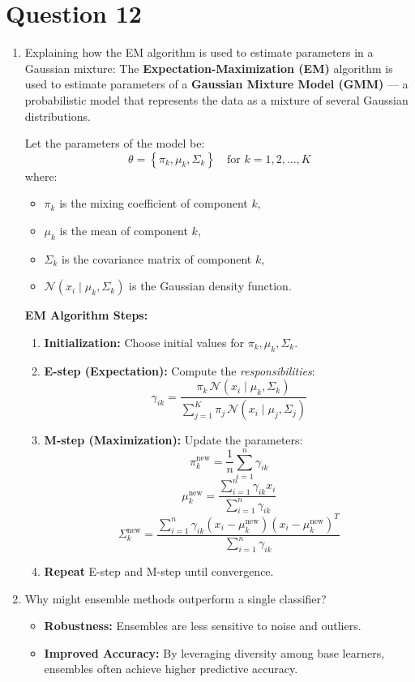 \documentclass[a4paper,12pt]{article}
\begin{document}
\section*{Question 12}
\begin{enumerate}[label=(\alph*)]
    \item Explaining how the EM algorithm is used to estimate parameters in a Gaussian mixture:
    The \textbf{Expectation-Maximization (EM)} algorithm is used to estimate parameters of a \textbf{Gaussian Mixture Model (GMM)} --- a probabilistic model that represents the data as a mixture of several Gaussian distributions.

    Let the parameters of the model be:
    \[
    \theta = \left\{ \pi_k, \mu_k, \Sigma_k \right\} \quad \text{for } k = 1, 2, \dots, K
    \]
    where:
    \begin{itemize}
        \item \( \pi_k \) is the mixing coefficient of component \( k \),
        \item \( \mu_k \) is the mean of component \( k \),
        \item \( \Sigma_k \) is the covariance matrix of component \( k \),
        \item \( \mathcal{N}(x_i \mid \mu_k, \Sigma_k) \) is the Gaussian density function.
    \end{itemize}

    \textbf{EM Algorithm Steps:}
    \begin{enumerate}
        \item \textbf{Initialization:} Choose initial values for \( \pi_k, \mu_k, \Sigma_k \).

        \item \textbf{E-step (Expectation):} Compute the \textit{responsibilities}:
        \[
        \gamma_{ik} = \frac{ \pi_k \, \mathcal{N}(x_i \mid \mu_k, \Sigma_k) }{ \sum_{j=1}^{K} \pi_j \, \mathcal{N}(x_i \mid \mu_j, \Sigma_j) }
        \]

        \item \textbf{M-step (Maximization):} Update the parameters:
        \[
        \pi_k^{\text{new}} = \frac{1}{n} \sum_{i=1}^{n} \gamma_{ik}
        \]
        \[
        \mu_k^{\text{new}} = \frac{ \sum_{i=1}^{n} \gamma_{ik} x_i }{ \sum_{i=1}^{n} \gamma_{ik} }
        \]
        \[
        \Sigma_k^{\text{new}} = \frac{ \sum_{i=1}^{n} \gamma_{ik} (x_i - \mu_k^{\text{new}})(x_i - \mu_k^{\text{new}})^T }{ \sum_{i=1}^{n} \gamma_{ik} }
        \]

        \item \textbf{Repeat} E-step and M-step until convergence.
    \end{enumerate}

    \item Why might ensemble methods outperform a single classifier?
    \begin{itemize}
        \item \textbf{Robustness:} Ensembles are less sensitive to noise and outliers.
        \item \textbf{Improved Accuracy:} By leveraging diversity among base learners, ensembles often achieve higher predictive accuracy.
    \end{itemize}
\end{enumerate}
\end{document}
